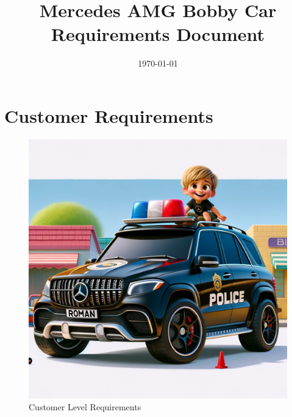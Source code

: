 \documentclass{article}
\title{Mercedes AMG Bobby Car \\ Requirements Document}
\date{\today}
\begin{document}
	
	\maketitle
	
	\tableofcontents %
	
	\newpage
	
	\section{Customer Requirements}
	
	\begin{figure}[h!] %
		\centering %
		\includegraphics[width=1.0\textwidth]{Customer_View.jpeg} %
		\caption{Customer Level Requirements}
	\end{figure}
	
\end{document}
